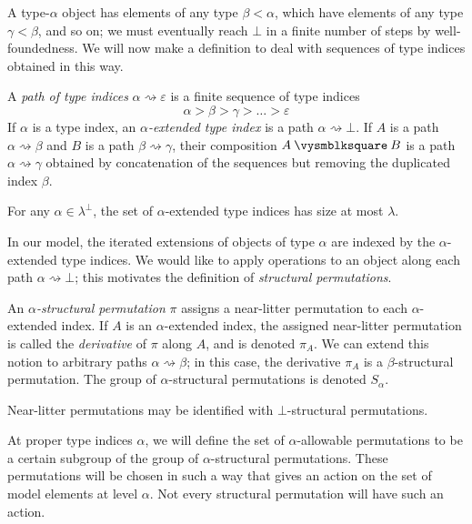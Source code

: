 A type-\( \alpha \) object has elements of any type \( \beta < \alpha \), which have elements of any type \( \gamma < \beta \), and so on; we must eventually reach \( \bot \) in a finite number of steps by well-foundedness.
We will now make a definition to deal with sequences of type indices obtained in this way.
\begin{definition}
    A \emph{path of type indices} \( \alpha \rightsquigarrow \varepsilon \) is a finite sequence of type indices
    \[ \alpha > \beta > \gamma > \dots > \varepsilon \]
    If \( \alpha \) is a type index, an \emph{\( \alpha \)-extended type index} is a path \( \alpha \rightsquigarrow \bot \).
    If \( A \) is a path \( \alpha \rightsquigarrow \beta \) and \( B \) is a path \( \beta \rightsquigarrow \gamma \), their composition \( A \pcomp B \) is a path \( \alpha \rightsquigarrow \gamma \) obtained by concatenation of the sequences but removing the duplicated index \( \beta \).
\end{definition}
\begin{remark}
    \label{rk:mk_extended_index}
    For any \( \alpha \in \lambda^\bot \), the set of \( \alpha \)-extended type indices has size at most \( \lambda \).
\end{remark}
In our model, the iterated extensions of objects of type \( \alpha \) are indexed by the \( \alpha \)-extended type indices.
We would like to apply operations to an object along each path \( \alpha \rightsquigarrow \bot \); this motivates the definition of \emph{structural permutations}.
\begin{definition}
    \label{def:struct_perm}
    An \emph{\( \alpha \)-structural permutation} \( \pi \) assigns a near-litter permutation to each \( \alpha \)-extended index.
    If \( A \) is an \( \alpha \)-extended index, the assigned near-litter permutation is called the \emph{derivative} of \( \pi \) along \( A \), and is denoted \( \pi_A \).
    We can extend this notion to arbitrary paths \( \alpha \rightsquigarrow \beta \); in this case, the derivative \( \pi_A \) is a \( \beta \)-structural permutation.
    The group of \( \alpha \)-structural permutations is denoted \( S_\alpha \).
\end{definition}
\begin{remark}
    Near-litter permutations may be identified with \( \bot \)-structural permutations.
\end{remark}

At proper type indices \( \alpha \), we will define the set of \( \alpha \)-allowable permutations to be a certain subgroup of the group of \( \alpha \)-structural permutations.
These permutations will be chosen in such a way that gives an action on the set of model elements at level \( \alpha \).
Not every structural permutation will have such an action.

